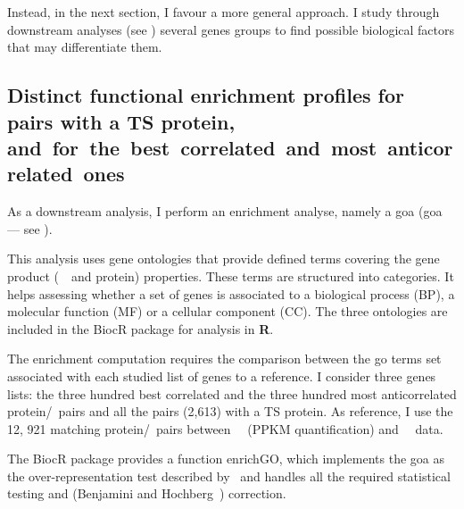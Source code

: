 Instead, in the next section, I favour a more general approach.
I study through downstream analyses (see )
several genes groups
to find possible biological factors that may differentiate them.

\subsection{Distinct functional enrichment profiles
for pairs with a TS protein,
and~for~the~best~correlated~and~most~anticorrelated~ones}

As a downstream analysis,
I perform an enrichment analyse,
namely a \glsdesc{goa} (\gls{goa} --- see ).

This analysis uses gene ontologies that provide defined terms
covering the gene product (\ie\ \mRNA\ and protein) properties.
These terms are structured into categories.
It helps assessing whether a set of genes is associated to
a biological process (BP), a molecular function (MF) or a cellular component (CC).
The three ontologies are included
in the \gls{BiocR} package 
for analysis in \textbf{\textsf{R}}.

The enrichment computation requires
the comparison between the \gls{go} terms set associated
with each studied list of genes to a reference.
I consider three genes lists:
the three hundred best correlated and
the three hundred most anticorrelated protein/\mRNA\ pairs
and all the pairs (2,613) with a \gls{TS} protein.
As reference, I use the 12, 921 matching protein/\mRNA\ pairs
between \pandey\ \etal\ (\gls{PPKM} quantification) and \uhlen\ \etal\ data.

The \gls{BiocR} package 
provides a function \textsf{enrichGO},
which implements the \gls{goa} as the over-representation test
described by~\citet{Boyle2004-dh}
and handles all the required statistical testing
and (Benjamini and Hochberg~) correction.

